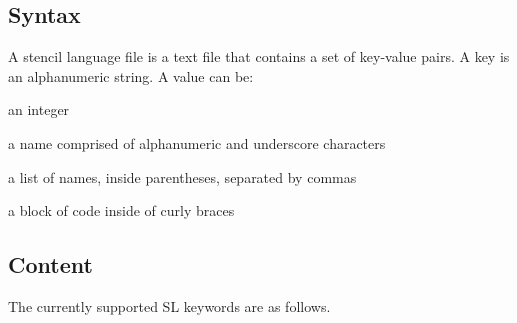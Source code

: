 \documentclass{sig-alternate}
\begin{document}
\subsection{Syntax}

A stencil language file is a text file that contains a set of key-value
pairs.  A key is an alphanumeric string.  A value can be:
\begin{itemize*}
\item an integer
\item a name comprised of alphanumeric and underscore characters
\item a list of names, inside parentheses, separated by commas
\item a block of code inside of curly braces
\end{itemize*}

\subsection{Content}

The currently supported SL keywords are as follows.
\end{document}
